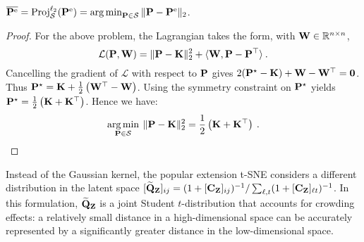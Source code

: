 \begin{proposition}
    $\overline{\mathbf{P}^{\mathrm{e}}} = \operatorname{Proj}^{\ell_2}_{\mathcal{S}}(\mathbf{P}^{\mathrm{e}}) = \operatorname*{arg\,min}_{\mathbf{P} \in \mathcal{S}}\| \mathbf{P} - \mathbf{P}^{\mathrm{e}} \|_2$. 
\end{proposition}

\begin{proof}
For the above problem, the Lagrangian takes the form, with $\mathbf{W} \in \mathbb{R}^{n \times n}$,
\begin{equation}
\mathcal{L}(\mathbf{P}, \mathbf{W}) = \| \mathbf{P} - \mathbf{K} \|_2^2 +\langle \mathbf{W}, \mathbf{P} -\mathbf{P}^{\top} \rangle \:.
\end{equation}
Cancelling the gradient of $\mathcal{L}$ with respect to $\mathbf{P}$ gives $2(\mathbf{P}^\star - \mathbf{K}) + \mathbf{W} - \mathbf{W}^\top = \bm{0}$. Thus $\mathbf{P}^\star = \mathbf{K} + \frac{1}{2} \left(\mathbf{W}^\top - \mathbf{W} \right)$. Using the symmetry constraint on $\mathbf{P}^\star$ yields $\mathbf{P}^\star = \frac{1}{2} \left(\mathbf{K} + \mathbf{K}^\top \right)$.
Hence we have:
\begin{equation}
\operatorname*{arg\,min}_{\mathbf{P} \in \mathcal{S}} \: \| \mathbf{P} -  \mathbf{K} \|_2^2 = \frac{1}{2} \left(\mathbf{K} + \mathbf{K}^\top \right) \:.
\end{equation}
\end{proof}


Instead of the Gaussian kernel, the popular extension t-SNE \citep{van2008visualizing} considers a different distribution in the latent space $[\widetilde{\mathbf{Q}}_{\mathbf{Z}}]_{ij} = (1 + [\mathbf{C}_{\mathbf{Z}}]_{ij})^{-1}/\sum_{\ell,t}(1 +
[\mathbf{C}_{\mathbf{Z}}]_{\ell t})^{-1}$. In this formulation, $\widetilde{\mathbf{Q}}_{\mathbf{Z}}$ is a joint
Student $t$-distribution that accounts for crowding effects: a relatively small
distance in a high-dimensional space can be accurately represented by a
significantly greater distance in the low-dimensional space.  